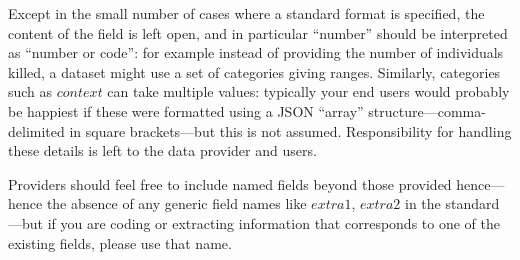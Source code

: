 \documentclass[11pt]{report}
\begin{document}
Except in the small number of cases where a standard format is specified, the content of the field is left open, and in particular ``number'' should be interpreted as ``number or code'': for example instead of providing the number of individuals killed, a dataset might use a set of categories giving ranges. Similarly, categories such as $context$ can take multiple values: typically your end users would probably be happiest if these were formatted using a JSON ``array'' structure---comma-delimited in square brackets---but this is not assumed. Responsibility for handling these details is left to the data provider and users.

Providers should feel free to include named fields beyond those provided hence---hence the absence of any generic field names like $extra1$, $extra2$ in the standard---but if you are coding or extracting information that corresponds to one of the existing fields, please use that name. 

\newpage 
\end{document}
